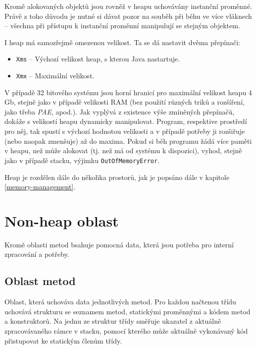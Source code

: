 Kromě alokovaných objektů jsou rovněž v heapu uchovávány instanční proměnné. Právě z toho důvodu je nutné si dávat pozor na souběh při běhu ve více vláknech --  všechna při přístupu k instanční proměnní manipulují se stejným objektem.

I heap má samozřejmě omezenou velikost. Ta se dá nastavit dvěma přepínači:

\begin{itemize}
	\item \texttt{Xms} -- Výchozí velikost heap, s kterou Java nastartuje.
	\item \texttt{Xmx} -- Maximální velikost.
\end{itemize}

V případě 32 bitového systému jsou horní hranicí pro maximální velikost heapu 4 Gb, stejně jako v případě velikosti RAM (bez použití různých triků a rozšíření, jako třeba \textit{PAE}, apod.). Jak vyplývá z existence výše zmíněných přepínačů,  dokáže s velikostí heapu dynamicky manipulovat. Program, respektive prostředí pro něj, tak spustí s výchozí hodnotou velikosti a v případě potřeby ji rozšiřuje (nebo naopak zmenšuje) až do maxima. Pokud si běh programu žádá více paměti v heapu, než může  alokovat (tj. než má od systému k dispozici), vyhod, stejně jako v případě stacku, výjimku \texttt{OutOfMemoryError}. 

Heap je rozdělen dále do několika prostorů, jak je popsáno dále v kapitole \ref{memory-management}.

\section{Non-heap oblast}
Kromě oblasti metod bsahuje pomocná data, která jsou potřeba pro interní zpracování a potřeby. 
\subsection{Oblast metod}
Oblast, která uchováva data jednotlivých metod. Pro každou načtenou třídu uchovává strukturu se seznamem metod, statickými proměnnými a kódem metod a konstruktorů. Na jednu ze struktur třídy směřuje ukazatel z aktuálně zpracovávaného rámce v stacku, pomocí kterého může aktuálně vykonávaný kód přistupovat ke statickým členům třídy.

